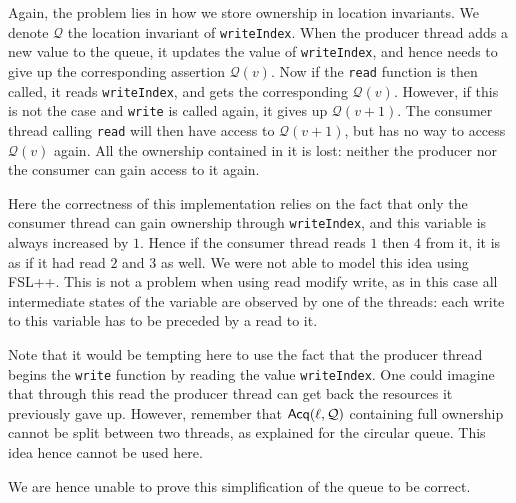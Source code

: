 Again, the problem lies in how we store ownership in location invariants. We denote $\mathcal{Q}$ the location invariant of \texttt{writeIndex}. When the producer thread adds a new value to the queue, it updates the value of \texttt{writeIndex}, and hence needs to give up the corresponding assertion $\mathcal{Q}(v)$. Now if the \texttt{read} function is then called, it reads \texttt{writeIndex}, and gets the corresponding $\mathcal{Q}(v)$. However, if this is not the case and \texttt{write} is called again, it gives up $\mathcal{Q}(v + 1)$. The consumer thread calling \texttt{read} will then have access to $\mathcal{Q}(v + 1)$, but has no way to access $\mathcal{Q}(v)$ again. All the ownership contained in it is lost: neither the producer nor the consumer can gain access to it again.

Here the correctness of this implementation relies on the fact that only the consumer thread can gain ownership through \texttt{writeIndex}, and this variable is always increased by $1$. Hence if the consumer thread reads $1$ then $4$ from it, it is as if it had read $2$ and $3$ as well. We were not able to model this idea using FSL++. This is not a problem when using read modify write, as in this case all intermediate states of the variable are observed by one of the threads: each write to this variable has to be preceded by a read to it.

Note that it would be tempting here to use the fact that the producer thread begins the \texttt{write} function by reading the value \texttt{writeIndex}. One could imagine that through this read the producer thread can get back the resources it previously gave up. However, remember that $\operatorname{\mathsf{Acq}}(\ell, \mathcal{Q})$ containing full ownership cannot be split between two threads, as explained for the circular queue. This idea hence cannot be used here.

We are hence unable to prove this simplification of the queue to be correct. 

